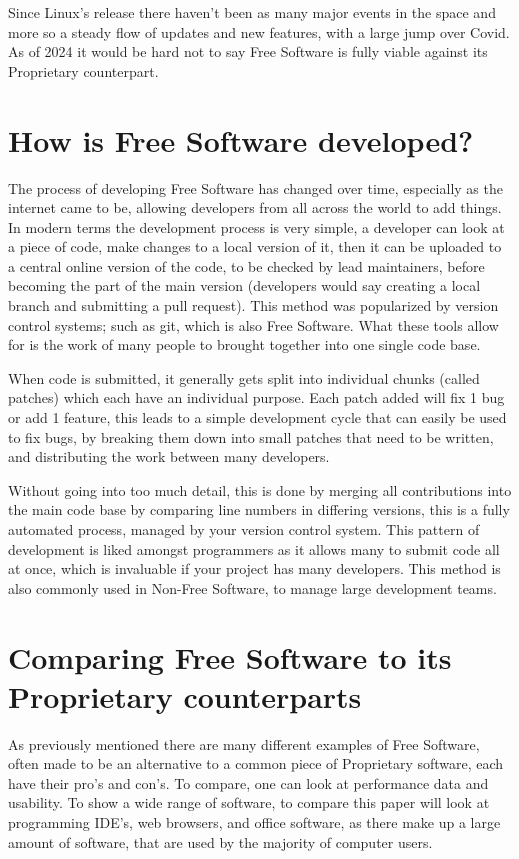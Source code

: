 \documentclass[a4paper,12pt]{article}
\begin{document}
{Since Linux's release there haven't been as many major events in the space and more so a steady flow
of updates and new features, with a large jump over Covid. As of 2024 it would be hard not to 
say Free Software is fully viable against its Proprietary counterpart.

\section{How is Free Software developed?}
The process of developing Free Software has changed over time, especially as the internet came to be,
allowing developers from all across the world to add things. In modern terms the development process is 
very simple, a developer can look at a piece of code, make changes to a local version of it, then it 
can be uploaded to a central online version of the code, to be checked by lead maintainers, before becoming
the part of the main version (developers would say creating a local branch and submitting a pull request). 
This method was popularized by version control systems; such as git\cite{GIT}, which is also Free Software. 
What these tools allow for is the work of many people to brought together into one single code base.

When code is submitted, it generally gets split into individual chunks (called patches) which each
have an individual purpose. Each patch added will fix 1 bug or add 1 feature, this leads to a simple
development cycle that can easily be used to fix bugs, by breaking them down into small patches that
need to be written, and distributing the work between many developers. 

Without going into too much detail, this is done by merging all contributions into the main code base
by comparing line numbers in differing versions, this is a fully automated process, managed by your
version control system. This pattern of development is liked amongst programmers as it allows many 
to submit code all at once, which is invaluable if your project has many developers. This method
is also commonly used in Non-Free Software, to manage large development teams\cite{NONFREEvcs}.

\section{Comparing Free Software to its Proprietary counterparts}
As previously mentioned there are many different examples of Free Software, often made to be an 
alternative to a common piece of Proprietary software, each have their pro's and con's. To compare,
one can look at performance data and usability. To show a wide range of software, to compare this paper 
will look at programming IDE's, web browsers, and office software, as there make up a large amount 
of software, that are used by the majority of computer users.

}
\end{document}
